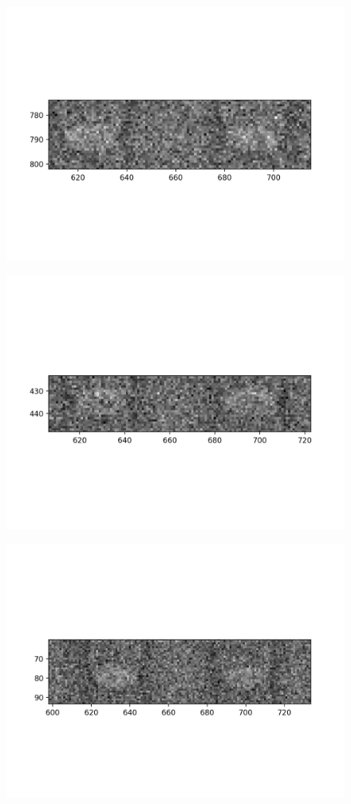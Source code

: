 \documentclass[10pt,a4paper]{article}
\begin{document}
\begin{figure}
	\includegraphics{data/image_stamps/a10}
\end{figure}
\begin{figure}
	\includegraphics{data/image_stamps/a11}
\end{figure}
\begin{figure}
	\includegraphics{data/image_stamps/a12}
\end{figure}
\end{document}
